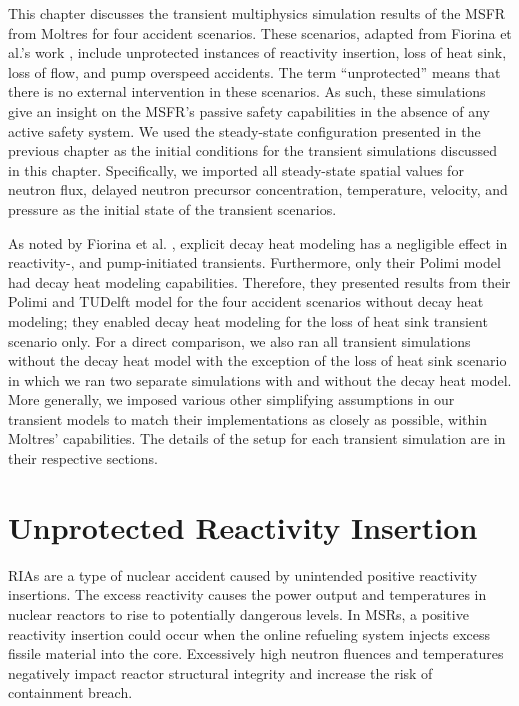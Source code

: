 This chapter discusses the transient multiphysics simulation results of the
\gls{MSFR} from Moltres for four accident scenarios. These scenarios, adapted
from Fiorina et al.'s work \cite{fiorina_modelling_2014}, include unprotected
instances of reactivity insertion, loss of heat sink, loss of flow, and pump
overspeed accidents. The term ``unprotected'' means that there is no
external intervention in these scenarios. As such, these simulations
give an insight on the \gls{MSFR}'s passive safety capabilities in the absence
of any active safety system. We used the steady-state configuration presented
in the previous chapter as the initial conditions for the transient
simulations discussed in this chapter. Specifically, we imported all
steady-state spatial values for neutron flux, delayed neutron precursor
concentration, temperature, velocity, and pressure as the initial state of the
transient scenarios.

As noted by Fiorina et al. \cite{fiorina_modelling_2014}, explicit decay heat
modeling has a negligible effect in reactivity-, and pump-initiated
transients. Furthermore, only their Polimi model had decay
heat modeling capabilities. Therefore, they presented results from their
Polimi and TUDelft model for the four accident scenarios  without decay heat
modeling; they enabled decay heat modeling for the loss of heat sink transient
scenario only. For a direct comparison, we also ran all transient simulations
without the decay heat model with the exception of the loss of heat sink
scenario in which we ran two separate simulations with and without
the decay heat model. More generally, we imposed various other simplifying
assumptions in our transient models to match their implementations as closely
as possible, within Moltres' capabilities. The details of the setup for each
transient simulation are in their respective sections.

\section{Unprotected Reactivity Insertion}

\glspl{RIA} are a type of nuclear accident caused by unintended positive
reactivity insertions. The excess reactivity causes the power output and
temperatures in nuclear reactors to rise to potentially dangerous levels. In
\glspl{MSR}, a positive reactivity insertion could occur when the online
refueling system injects excess fissile material into the core. Excessively
high neutron fluences and temperatures negatively impact reactor structural
integrity and increase the risk of containment breach.

